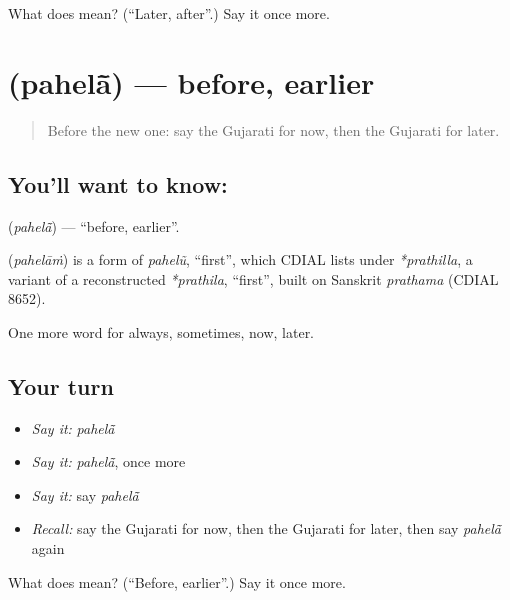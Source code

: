 \begin{tcolorbox}[breakable,colback=teal!4,colframe=teal!35!black,title={Before you move on}]
What does  mean? (\textquotedblleft{}Later, after\textquotedblright{}.) Say it once more.
\end{tcolorbox}
\section[\texorpdfstring{\gu{પહેલાં} (pahelā̃)}{પહેલાં (pahelā̃)}]{ (pahelā̃) — before, earlier}

\label{lesson:GU-C77-before}



\begin{quote}
Before the new one: say the Gujarati for now, then the Gujarati for later.
\end{quote}

\subsection*{You'll want to know: }
\textbf{} (\emph{pahelā̃}) — \textquotedblleft{}before, earlier\textquotedblright{}.

\begin{cousinweb}
\textbf{} (\emph{pahelāṁ}) is a form of \emph{pahelũ}, \textquotedblleft{}first\textquotedblright{}, which CDIAL lists under \emph{*prathilla}, a variant of a reconstructed \emph{*prathila}, \textquotedblleft{}first\textquotedblright{}, built on Sanskrit \emph{prathama} (CDIAL 8652).
\end{cousinweb}

\begin{grammarlens}[title={What you've built}]
One more word for always, sometimes, now, later.
\end{grammarlens}

\subsection*{Your turn}
\begin{itemize}
\raggedright
  \item \emph{Say it:} \emph{pahelā̃}
  \item \emph{Say it:} \emph{pahelā̃}, once more
  \item \emph{Say it:} say \emph{pahelā̃}
  \item \emph{Recall:} say the Gujarati for now, then the Gujarati for later, then say \emph{pahelā̃} again
\end{itemize}

\begin{tcolorbox}[breakable,colback=teal!4,colframe=teal!35!black,title={Before you move on}]
What does  mean? (\textquotedblleft{}Before, earlier\textquotedblright{}.) Say it once more.
\end{tcolorbox}
